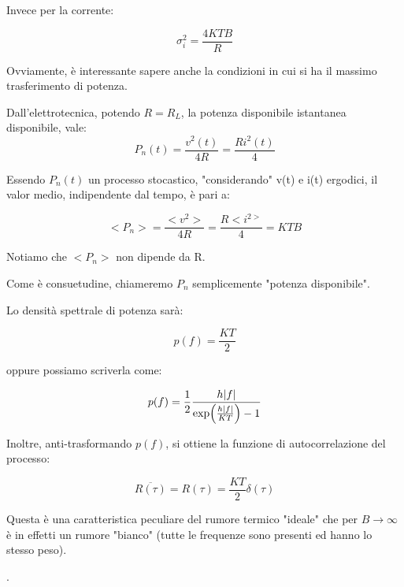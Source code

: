 Invece per la corrente: 

{
    \Large 
    \begin{equation}
        \sigma_i ^{2} = \frac{4 KTB}{R}
    \end{equation}
}

Ovviamente, è interessante sapere anche la condizioni in cui si ha il massimo trasferimento di potenza. \newline 

Dall'elettrotecnica, potendo $R = R_L$, la potenza disponibile istantanea disponibile, vale: 
{
    \Large 
    \begin{equation}
        P_n (t) = \frac{v^{2} (t)}{4R} = \frac{R i^{2} (t)}{4}
    \end{equation}
} 

Essendo $P_n (t)$ un processo stocastico, "considerando" v(t) e i(t) ergodici, il valor medio, indipendente dal tempo, è pari a: 

{
    \Large 
    \begin{equation}
        <P_n> = \frac{<v^{2}>}{4 R} = \frac{R <i^{2>}}{4} = KTB
    \end{equation}
}

Notiamo che $<P_n>$ non dipende da R. \newline 

Come è consuetudine, chiameremo $P_n$ semplicemente "potenza disponibile". \newline 

Lo densità spettrale di potenza sarà: 

{
    \Large 
    \begin{equation}
        p (f) = \frac{KT}{2}
    \end{equation}
}

oppure possiamo scriverla come: 

{
    \Large 
    \begin{equation}
        p(f) = \frac{1}{2} \frac{h \abs{f}}{\exp(\frac{h \abs{f}}{KT}) -1}
    \end{equation}
}


Inoltre, anti-trasformando $p(f)$, si ottiene la funzione di autocorrelazione del processo: 

{
    \Large 
    \begin{equation}
        \overline{R (\tau)} = R(\tau) = \frac{KT}{2} \delta (\tau)
    \end{equation}
}


Questa è una caratteristica peculiare del rumore termico "ideale" che per $B \to \infty$ è in effetti un rumore "bianco" 
(tutte le frequenze sono presenti ed hanno lo stesso peso). \newline 

\newpage 
. 
\newpage
